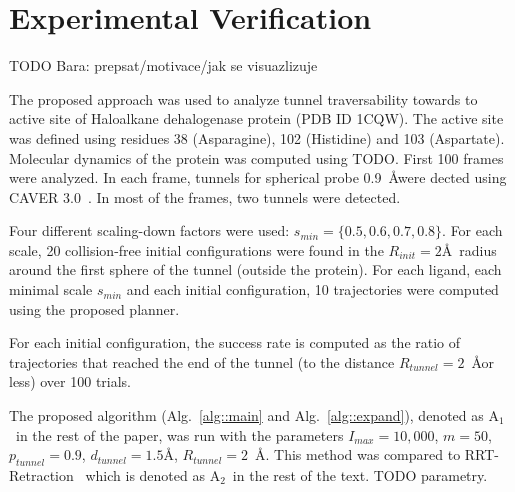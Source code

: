 \documentclass[usletter, 10pt, conference]{ieeeconf} %
\def\dt{d_{tunnel}}
\def\RI{R_{init}}
\def\rv{R_{tunnel}}
\def\Imax{I_{max}} %
\def\smin{s_{min}}
\def\gb{p_{tunnel}}
\def\LA{L_1}
\def\LB{L_2}
\def\RA{A$_{1}$}
\def\RB{A$_{2}$}
\begin{document}
\def\cstart{\overline{c_{start}}}
\def\cend{\overline{c_{end}}}



\section{Experimental Verification}

TODO Bara: prepsat/motivace/jak se visuazlizuje

The proposed approach was used to analyze tunnel traversability towards to active site of Haloalkane dehalogenase protein (PDB ID 1CQW).
The active site was defined using residues 38 (Asparagine), 102 (Histidine) and 103 (Aspartate).
Molecular dynamics of the protein was computed using TODO. 
First 100 frames were analyzed. 
In each frame, tunnels for spherical probe 0.9~\AA were dected using CAVER 3.0~\cite{caver3}. 
In most of the frames, two tunnels were detected.



Four different scaling-down factors were used: $\smin=\{0.5,0.6,0.7,0.8\}$.
For each scale, 20 collision-free initial configurations were found in the $\RI=2$\AA\ radius around the first sphere of the tunnel (outside the protein).
For each ligand, each minimal scale $\smin$ and each initial configuration, 10 trajectories were computed using the proposed planner.

For each initial configuration, the success rate is computed as the ratio of trajectories that reached the end of the tunnel (to the distance 
 $\rv=2$~\AA or less) over 100 trials.

The proposed algorithm (Alg.~\ref{alg::main} and Alg.~\ref{alg::expand}), denoted as \RA\ in the rest of the paper, was run
with the parameters $\Imax=10,000$, $m=50$, $\gb=0.9$, $\dt=1.5$\AA, $\rv=2$~\AA.
This method was compared to RRT-Retraction~\cite{zhangRetraction} which is denoted as \RB\ in the rest of the text.
TODO parametry.
\end{document}
